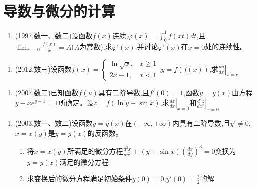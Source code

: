 \documentclass[12pt, a4paper, oneside, UTF8]{ctexbook}
\begin{document}
\section{导数与微分的计算}

\begin{enumerate}[label=\arabic*.,start=4]
    \item (1997,数一、数二)设函数$f(x)$连续,$\varphi(x)=\int_0^1 f(xt)dt$,且$\lim_{x\to0}\frac{f(x)}{x}=A$($A$为常数),求$\varphi'(x)$,并讨论$\varphi'(x)$在$x=0$处的连续性。
    
    \begin{solution}
    
    \end{solution}
\end{enumerate}

\begin{enumerate}[label=\arabic*.,start=5]
    \item (2012,数三)设函数$f(x)=\begin{cases}
        \ln\sqrt{x}, & x\geq1 \\
        2x-1, & x<1
    \end{cases}$,$y=f(f(x))$,求$\left.\frac{dy}{dx}\right|_{x=e}$
    
    \begin{solution}
    
    \end{solution}
\end{enumerate}

\begin{enumerate}[label=\arabic*.,start=6]
    \item (2007,数二)已知函数$f(u)$具有二阶导数,且$f'(0)=1$,函数$y=y(x)$由方程$y-xe^{y-1}=1$所确定。设$z=f(\ln y-\sin x)$,求$\left.\frac{dz}{dx}\right|_{x=0}$和$\left.\frac{d^2z}{dx^2}\right|_{x=0}$
    
    \begin{solution}
    
    \end{solution}
\end{enumerate}

\begin{enumerate}[label=\arabic*.,start=7]
    \item (2003,数一、数二)设函数$y=y(x)$在$(-\infty,+\infty)$内具有二阶导数,且$y'\neq0$,$x=x(y)$是$y=y(x)$的反函数。
    \begin{enumerate}[label=(\roman*)]
        \item 将$x=x(y)$所满足的微分方程$\frac{d^2x}{dy^2}+(y+\sin x)\left(\frac{dx}{dy}\right)^3=0$变换为$y=y(x)$满足的微分方程
        \item 求变换后的微分方程满足初始条件$y(0)=0$,$y'(0)=\frac{3}{2}$的解
    \end{enumerate}
    
    \begin{solution}
    
    \end{solution}
\end{enumerate}
\end{document}
